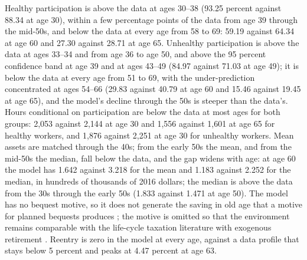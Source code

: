 Healthy participation is above the data at ages 30--38 (93.25 percent against 88.34 at age 30), within a few percentage points of the data from age 39 through the mid-50s, and below the data at every age from 58 to 69: 59.19 against 64.34 at age 60 and 27.30 against 28.71 at age 65. %
Unhealthy participation is above the data at ages 33--34 and from age 36 to age 50, and above the 95 percent confidence band at age 39 and at ages 43--49 (84.97 against 71.03 at age 49); it is below the data at every age from 51 to 69, with the under-prediction concentrated at ages 54--66 (29.83 against 40.79 at age 60 and 15.46 against 19.45 at age 65), and the model's decline through the 50s is steeper than the data's.
Hours conditional on participation are below the data at most ages for both groups: 2,053 against 2,144 at age 30 and 1,556 against 1,601 at age 65 for healthy workers, and 1,876 against 2,251 at age 30 for unhealthy workers. %
Mean assets are matched through the 40s; from the early 50s the mean, and from the mid-50s the median, fall below the data, and the gap widens with age: at age 60 the model has 1.642 against 3.218 for the mean and 1.183 against 2.252 for the median, in hundreds of thousands of 2016 dollars; the median is above the data from the 30s through the early 50s (1.833 against 1.471 at age 50). %
The model has no bequest motive, so it does not generate the saving in old age that a motive for planned bequests produces \citep{Denardi2010,lockwood2018incidental}; the motive is omitted so that the environment remains comparable with the life-cycle taxation literature with exogenous retirement \citep{farhi2013insurance,golosov2016redistribution,Stantcheva2017}. %
Reentry is zero in the model at every age, against a data profile that stays below 5 percent and peaks at 4.47 percent at age 63. %


